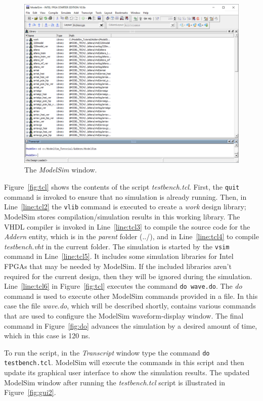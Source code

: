 \documentclass[11pt, twoside, pdftex]{article}
\begin{document}
\begin{figure}[bh!]
	\begin{center}
		\includegraphics[width = .9\textwidth]{figures/gui1.png}
	\end{center}
		  \caption{The {\it ModelSim} window.}
	\label{fig:gui1}
\end{figure}

\noindent
Figure~\ref{fig:tcl} shows the contents of the script {\it testbench.tcl}. First, the
\texttt{quit} command is invoked to ensure that no simulation is already running. Then, in
Line~\ref{line:tcl2} the \texttt{vlib} command is executed to create a {\it work} design
library; ModelSim stores compilation/simulation results in this working library.   
The VHDL compiler is invoked in Line~\ref{line:tcl3} to
compile the source code for the {\it Addern} entity, which is in the {\it parent} folder (../),  
and in Line~\ref{line:tcl4} to compile {\it testbench.vht} in the current folder.
The simulation is started by the \texttt{vsim} command in Line~\ref{line:tcl5}. It includes some
simulation libraries for Intel FPGAs that may be needed by ModelSim.
If the included libraries aren't required for the current
design, then they will be ignored during the simulation. 
Line~\ref{line:tcl6} in Figure~\ref{fig:tcl} executes the command \texttt{do~wave.do}.
The {\it do} command is used to execute other ModelSim commands provided in a file. In
this case the file {\it wave.do}, which will be described shortly, contains various commands
that are used to configure the ModelSim waveform-display window. The final command in Figure~\ref{fig:do}
advances the simulation by a desired amount of time, which in this case is 120 ns.

\noindent
To run the script, in the {\it Transcript} window type the command
\texttt{do testbench.tcl}. ModelSim will execute the commands in this script and then
update its graphical user interface to show the simulation results. 
The updated ModelSim window after running the {\it testbench.tcl} script is illustrated 
in Figure~\ref{fig:gui2}.
\end{document}
